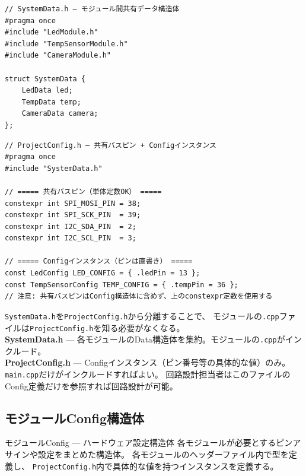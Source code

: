 \begin{lstlisting}[style=cppstyle, caption={SystemData.h構成例}]
// SystemData.h — モジュール間共有データ構造体
#pragma once
#include "LedModule.h"
#include "TempSensorModule.h"
#include "CameraModule.h"

struct SystemData {
    LedData led;
    TempData temp;
    CameraData camera;
};
\end{lstlisting}

\begin{lstlisting}[style=cppstyle, caption={ProjectConfig.h構成例}]
// ProjectConfig.h — 共有バスピン + Configインスタンス
#pragma once
#include "SystemData.h"

// ===== 共有バスピン（単体定数OK） =====
constexpr int SPI_MOSI_PIN = 38;
constexpr int SPI_SCK_PIN  = 39;
constexpr int I2C_SDA_PIN  = 2;
constexpr int I2C_SCL_PIN  = 3;

// ===== Configインスタンス（ピンは直書き） =====
const LedConfig LED_CONFIG = { .ledPin = 13 };
const TempSensorConfig TEMP_CONFIG = { .tempPin = 36 };
// 注意: 共有バスピンはConfig構造体に含めず、上のconstexpr定数を使用する
\end{lstlisting}

\begin{notebox}[ファイル分離の理由]
\texttt{SystemData.h}を\texttt{ProjectConfig.h}から分離することで、
モジュールの\texttt{.cpp}ファイルは\texttt{ProjectConfig.h}を知る必要がなくなる。\\
\textbf{SystemData.h} — 各モジュールのData構造体を集約。モジュールの\texttt{.cpp}がインクルード。\\
\textbf{ProjectConfig.h} — Configインスタンス（ピン番号等の具体的な値）のみ。
\texttt{main.cpp}だけがインクルードすればよい。
回路設計担当者はこのファイルのConfig定義だけを参照すれば回路設計が可能。
\end{notebox}


\subsection{モジュールConfig構造体}

\begin{apibox}{モジュールConfig — ハードウェア設定構造体}
各モジュールが必要とするピンアサインや設定をまとめた構造体。
各モジュールのヘッダーファイル内で型を定義し、
\texttt{ProjectConfig.h}内で具体的な値を持つインスタンスを定義する。
\end{apibox}

